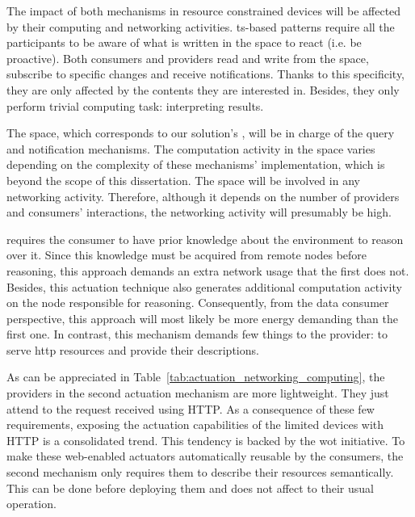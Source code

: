 


\bigskip

The impact of both mechanisms in resource constrained devices will be affected by their computing and networking activities.
\ac{ts}-based patterns require all the participants to be aware of what is written in the space to react (i.e. be proactive).
Both consumers and providers read and write from the space, subscribe to specific changes and receive notifications.
Thanks to this specificity, they are only affected by the contents they are interested in. %
Besides, they only perform trivial computing task: interpreting results. %


The space, which corresponds to our solution's \coordspace{}, will be in charge of the query and notification mechanisms.
The computation activity in the space varies depending on the complexity of these mechanisms' implementation, which is beyond the scope of this dissertation.
The space will be involved in any networking activity.
Therefore, although it depends on the number of providers and consumers' interactions, the networking activity will presumably be high.


\restActuation{} requires the consumer to have prior knowledge about the environment to reason over it. %
Since this knowledge must be acquired from remote nodes before reasoning, this approach demands an extra network usage that the first does not.
Besides, this actuation technique also generates additional computation activity on the node responsible for reasoning.
Consequently, from the data consumer perspective, this approach will most likely be more energy demanding than the first one. %
In contrast, this mechanism demands few things to the provider: to serve \ac{http} resources and provide their descriptions. %





\bigskip


As can be appreciated in Table~\ref{tab:actuation_networking_computing}, the providers in the second actuation mechanism are more lightweight.
They just attend to the request received using HTTP.
As a consequence of these few requirements, exposing the actuation capabilities of the limited devices with HTTP is a consolidated trend.
This tendency is backed by the \ac{wot} initiative.
To make these web-enabled actuators automatically reusable by the consumers, the second mechanism only requires them to describe their resources semantically.
This can be done before deploying them and does not affect to their usual operation.



